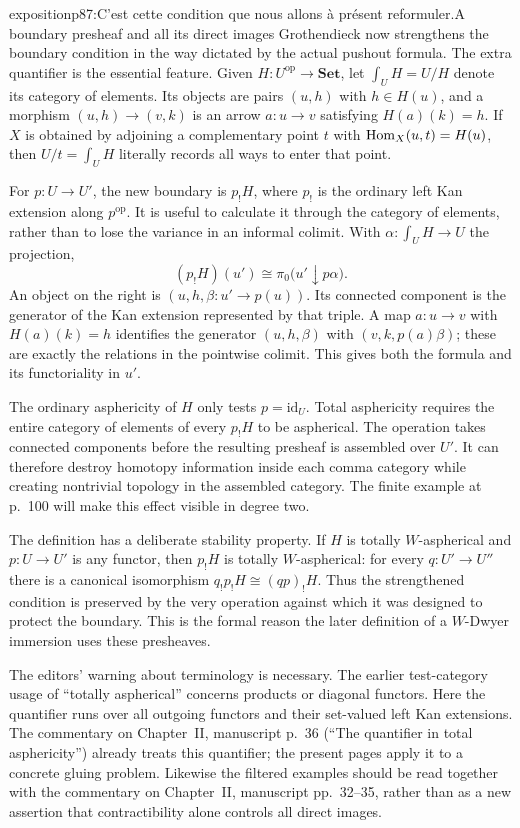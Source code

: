 \begin{dcomment}{exposition}{p87:C’est cette condition que nous allons à présent reformuler.}{A boundary presheaf and all its direct images}
Grothendieck now strengthens the boundary condition in the way dictated by the actual pushout formula. The extra quantifier is the essential feature. Given $H:U^{\mathrm{op}}\to\mathbf{Set}$, let $\int_U H=U/H$ denote its category of elements. Its objects are pairs $(u,h)$ with $h\in H(u)$, and a morphism $(u,h)\to(v,k)$ is an arrow $a:u\to v$ satisfying $H(a)(k)=h$. If $X$ is obtained by adjoining a complementary point $t$ with $\mathrm{Hom}_X(u,t)=H(u)$, then $U/t=\int_U H$ literally records all ways to enter that point.

For $p:U\to U'$, the new boundary is $p_!H$, where $p_!$ is the ordinary left Kan extension along $p^{\mathrm{op}}$. It is useful to calculate it through the category of elements, rather than to lose the variance in an informal colimit. With $\alpha:\int_UH\to U$ the projection,
\[
(p_!H)(u')\cong\pi_0\bigl(u'\downarrow p\alpha\bigr).
\]
An object on the right is $(u,h,\beta:u'\to p(u))$. Its connected component is the generator of the Kan extension represented by that triple. A map $a:u\to v$ with $H(a)(k)=h$ identifies the generator $(u,h,\beta)$ with $(v,k,p(a)\beta)$; these are exactly the relations in the pointwise colimit. This gives both the formula and its functoriality in $u'$.

The ordinary asphericity of $H$ only tests $p=\mathrm{id}_U$. Total asphericity requires the entire category of elements of every $p_!H$ to be aspherical. The operation takes connected components before the resulting presheaf is assembled over $U'$. It can therefore destroy homotopy information inside each comma category while creating nontrivial topology in the assembled category. The finite example at p.~100 will make this effect visible in degree two.

The definition has a deliberate stability property. If $H$ is totally $W$-aspherical and $p:U\to U'$ is any functor, then $p_!H$ is totally $W$-aspherical: for every $q:U'\to U''$ there is a canonical isomorphism $q_!p_!H\cong(qp)_!H$. Thus the strengthened condition is preserved by the very operation against which it was designed to protect the boundary. This is the formal reason the later definition of a $W$-Dwyer immersion uses these presheaves.

The editors' warning about terminology is necessary. The earlier test-category usage of ``totally aspherical'' concerns products or diagonal functors. Here the quantifier runs over all outgoing functors and their set-valued left Kan extensions. The commentary on Chapter~II, manuscript p.~36 (``The quantifier in total asphericity'') already treats this quantifier; the present pages apply it to a concrete gluing problem. Likewise the filtered examples should be read together with the commentary on Chapter~II, manuscript pp.~32--35, rather than as a new assertion that contractibility alone controls all direct images.
\end{dcomment}


